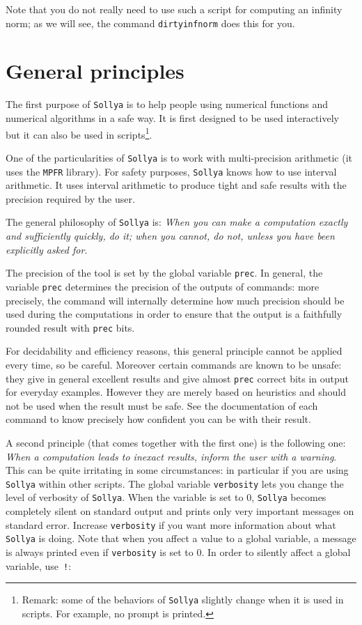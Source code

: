 \documentclass[a4paper]{article}
\newcommand{\com}[1]{\texttt{#1}}
\newcommand{\key}[1]{\texttt{#1}}
\newcommand{\sollya}{\texttt{Sollya}\xspace}
\begin{document}
Note that you do not really need to use such a script for computing an infinity norm; as we will see, the command \com{dirtyinfnorm} does this for you.

\section{General principles}\label{sec:general_principles}
The first purpose of \sollya is to help people using numerical functions and numerical algorithms in a safe way. It is first designed to be used interactively but it can also be used in scripts\footnote{Remark: some of the behaviors of \sollya slightly change when it is used in scripts. For example, no prompt is printed.}.

One of the particularities of \sollya is to work with multi-precision arithmetic (it uses the \texttt{MPFR} library). For safety purposes, \sollya knows how to use interval arithmetic. It uses interval arithmetic to produce tight and safe results with the precision required by the user.

The general philosophy of \sollya is: \emph{When you can make a computation exactly and sufficiently quickly, do it; when you cannot, do not, unless you have been explicitly asked for.}

The precision of the tool is set by the global variable \key{prec}. In general, the variable \key{prec} determines the precision of the outputs of commands: more precisely, the command will internally determine how much precision should be used during the computations in order to ensure that the output is a faithfully rounded result with \key{prec} bits.

For decidability and efficiency reasons, this general principle cannot be applied every time, so be careful. Moreover certain commands are known to be unsafe: they give in general excellent results and give almost \key{prec} correct bits in output for everyday examples. However they are merely based on heuristics and should not be used when the result must be safe. See the documentation of each command to know precisely how confident you can be with their result.

A second principle (that comes together with the first one) is the following one: \emph{When a computation leads to inexact results, inform the user with a warning}. This can be quite irritating in some circumstances: in particular if you are using \sollya within other scripts. The global variable \key{verbosity} lets you change the level of verbosity of \sollya. When the variable is set to $0$, \sollya becomes completely silent on standard output and prints only very important messages on standard error. Increase \key{verbosity} if you want more information about what \sollya is doing. Note that when you affect a value to a global variable, a message is always printed even if \com{verbosity} is set to $0$. In order to silently affect a global variable, use~\texttt{!}:
\end{document}
